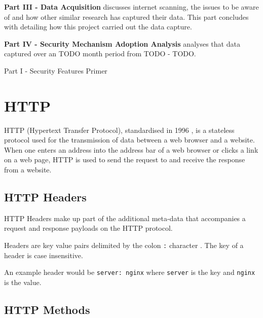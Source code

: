 \documentclass{mscreport}
\begin{document}
\vspace{0.3cm} \noindent
\textbf{Part III - Data Acquisition} discusses internet scanning, the issues to be aware of and how other similar research has captured their data. This part concludes with detailing how this project carried out the data capture.

\vspace{0.3cm} \noindent
\textbf{Part IV - Security Mechanism Adoption Analysis} analyses that data captured over an TODO month period from TODO - TODO.

\newpage

\vspace*{\fill}
\begin{center}
\begin{huge}
Part I - Security Features Primer
\end{huge}
\end{center}
\vspace{\fill}

\newpage

\section{HTTP}
\label{section:http}

HTTP (Hypertext Transfer Protocol), standardised in 1996 \cite{Berners-Lee1996-ji}, is a stateless protocol used for the transmission of data between a web browser and a website. When one enters an address into the address bar of a web browser or clicks a link on a web page, HTTP is used to send the request to and receive the response from a website.

\subsection{HTTP Headers}

\noindent HTTP Headers make up part of the additional meta-data that accompanies a request and response payloads on the HTTP protocol.

\vspace{0.3cm} \noindent
Headers are key value pairs delimited by the colon \texttt{:} character \cite{Berners-Lee1996-ji}. The key of a header is case insensitive.

\vspace{0.3cm} \noindent
An example header would be \texttt{server: nginx} where \texttt{server} is the key and \texttt{nginx} is the value.

\subsection{HTTP Methods}
\end{document}
